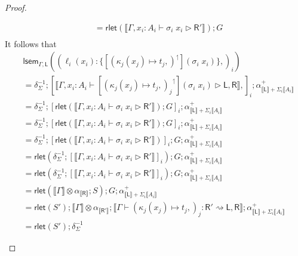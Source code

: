 \documentclass[acmsmall,screen,review]{acmart}
\newcommand{\ms}[1]{\ensuremath{\mathsf{#1}}}
\newcommand{\lto}{:}
\newcommand{\wbranch}[3]{#1(#2) \lto \{#3\}}
\newcommand{\lupg}[1]{{#1}^\upharpoonleft}
\newcommand{\bhyp}[2]{#1 : #2}
\newcommand{\haslb}[3]{#1 \vdash #2 \rhd #3}
\newcommand{\lbsubst}[4]{#1 \vdash #2: #3 \rightsquigarrow #4}
\newcommand{\dnt}[1]{\llbracket{#1}\rrbracket}
\newcommand{\loopmor}[3]{\ms{lsem}_{#1, #3}(#2)}
\newcommand{\rlmor}[1]{\ms{rlet}(#1)}
\begin{document}
\begin{proof}
\begin{itemize}[leftmargin=*]
\begin{equation}
\begin{aligned}
        & = \rlmor{
          \dnt{\haslb{\Gamma, \bhyp{x_i}{A_i}}{\sigma_i\;x_i}{\ms{R}'}}
        } ; G \\
      \end{aligned}
    \end{equation}
    It follows that
    \begin{equation}
      \begin{aligned}
        & \loopmor{\Gamma}
          {(\wbranch{\ell_i}{x_i}{[\lupg{(\kappa_j(x_j) \mapsto t_j,)}](\sigma_i\;x_i)},)_i}
          {\ms{L}}
        \\
        & = \delta^{-1}_\Sigma 
          ; [ \dnt{\haslb{\Gamma, \bhyp{x_i}{A_i}}
                  {[\lupg{(\kappa_j(x_j) \mapsto t_j,)_j}](\sigma_i\;x_i)}{\ms{L}, \ms{R}}}, ]_i
          ; \alpha^+_{\dnt{\ms{L}} + \Sigma_i \dnt{A_i}}   \\
        & = \delta^{-1}_\Sigma 
          ; [ \rlmor{
                \dnt{\haslb{\Gamma, \bhyp{x_i}{A_i}}{\sigma_i\;x_i}{\ms{R}'}}
              } ; G ]_i
          ; \alpha^+_{\dnt{\ms{L}} + \Sigma_i \dnt{A_i}}   \\
        & = \delta^{-1}_\Sigma 
          ; [ \rlmor{
                \dnt{\haslb{\Gamma, \bhyp{x_i}{A_i}}{\sigma_i\;x_i}{\ms{R}'}}
              } ; G ]_i
          ; \alpha^+_{\dnt{\ms{L}} + \Sigma_i \dnt{A_i}}   \\
        & = \delta^{-1}_\Sigma 
          ; [\rlmor{
                \dnt{\haslb{\Gamma, \bhyp{x_i}{A_i}}{\sigma_i\;x_i}{\ms{R}'}}
              }]_i ; G ; \alpha^+_{\dnt{\ms{L}} + \Sigma_i \dnt{A_i}}  \\
        & = \rlmor{\delta^{-1}_\Sigma 
          ; [
                \dnt{\haslb{\Gamma, \bhyp{x_i}{A_i}}{\sigma_i\;x_i}{\ms{R}'}}
            ]_i} ; G ; \alpha^+_{\dnt{\ms{L}} + \Sigma_i \dnt{A_i}}   \\
        & = \rlmor{\delta^{-1}_\Sigma 
          ; [
                \dnt{\haslb{\Gamma, \bhyp{x_i}{A_i}}{\sigma_i\;x_i}{\ms{R}'}}
            ]_i} ; G ; \alpha^+_{\dnt{\ms{L}} + \Sigma_i \dnt{A_i}}   \\
        & = \rlmor{\dnt{\Gamma} \otimes \alpha_{\dnt{\ms{R}}} ; S} ; G 
          ; \alpha^+_{\dnt{\ms{L}} + \Sigma_i \dnt{A_i}} \\
        & = \rlmor{S'} ; \dnt{\Gamma} \otimes \alpha_{\dnt{\ms{R'}}} 
          ; \dnt{\lbsubst{\Gamma}{(\kappa_j(x_j) \mapsto t_j,)_j}{\ms{R}'}{\ms{L}, \ms{R}}}
          ; \alpha^+_{\dnt{\ms{L}} + \Sigma_i \dnt{A_i}} \\
        & = \rlmor{S'} ; \delta^{-1}_{\Sigma}

\end{aligned}
\end{equation}
\end{itemize}
\end{proof}
\end{document}
